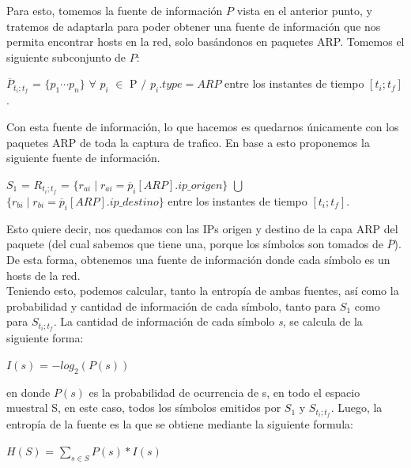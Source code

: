 Para esto, tomemos la fuente de información $P$ vista en el anterior punto, y tratemos de adaptarla para poder obtener una fuente de información que nos permita encontrar hosts en la red, solo basándonos en paquetes ARP.
Tomemos el siguiente subconjunto de $P$: 

\begin{center}
	$\overline{P}_{t_i;t_f}$ = $\{p_1 \dotsb p_n\}$ $\forall$ $p_i$ $\in$ P $/$ $p_i.type = ARP$ entre los instantes de tiempo $[t_i; t_f ]$.
\end{center}

Con esta fuente de información, lo que hacemos es quedarnos únicamente con los paquetes ARP de toda la captura de trafico. En base a esto proponemos la siguiente fuente de información.

\begin{center}
	$S_1$ = $R_{t_i;t_f}$ = $\{r_{ai} \mid r_{ai} = \overline{p}_i[ARP].ip\_origen \}$ $\bigcup$ $\{r_{bi} \mid r_{bi} = \overline{p}_i[ARP].ip\_destino \}$ entre los instantes de tiempo $[t_i; t_f ]$.
\end{center}

Esto quiere decir, nos quedamos con las IPs origen y destino de la capa ARP del paquete (del cual sabemos que tiene una, porque los símbolos son tomados de $\overline{P}$). De esta forma, obtenemos una fuente de información donde cada símbolo es un hosts de la red. \\

Teniendo esto, podemos calcular, tanto la entropía de ambas fuentes, así como la probabilidad y cantidad de información de cada símbolo, tanto para $S_1$ como para $S_{t_i;t_f}$. La cantidad de información de cada símbolo \textit{s}, se calcula de la siguiente forma:

\begin{center}
	$I(s)$ = $-log_2(P(s))$
\end{center}

en donde $P(s)$ es la probabilidad de ocurrencia de s, en todo el espacio muestral S, en este caso, todos los símbolos emitidos por $S_1$ y $S_{t_i;t_f}$. Luego, la entropía de la fuente es la que se obtiene mediante la siguiente formula:

\begin{center}
	$H(S)$ = $\sum_{s \in S} P(s)*I(s)$
\end{center}



